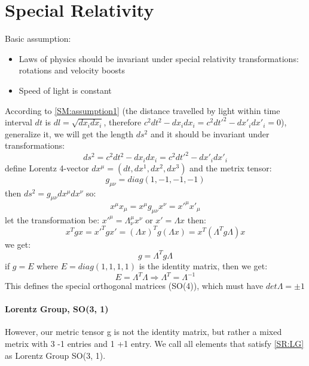 \chapter{Special Relativity}
Basic assumption:
\begin{itemize}
    \item Laws of physics should be invariant under special relativity 
	transformations: rotations and velocity boosts	\eqnum\label{SM:assumption1}
    \item Speed of light is constant	\eqnum\label{SM:assumption2}
\end{itemize}

According to \ref{SM:assumption1} 
(the distance travelled by light within time
interval $dt$ is $dl = \sqrt{dx_idx_i}$, therefore $c^2dt^2 - dx_idx_i = c^2dt'^2 - dx'_idx'_i = 0$), 
generalize it, we will get the length $ds^2$ and it should be invariant under
transformations:
\begin{equation}
    ds^2 = c^2dt^2 - dx_idx_i = c^2dt'^2 - dx'_i dx'_i
\end{equation}
define Lorentz 4-vector $dx^\mu = (dt, dx^1, dx^2, dx^3)$ and the metrix tensor:
$$ g_{\mu\nu} = diag(1,-1, -1, -1) $$
then $ds^2 = g_{\mu\nu} dx^\mu dx^\nu$
so:
\begin{equation}
    x^\mu x_\mu = x^\mu g_{\mu\nu}x^\nu = x'^\mu x'_\mu
\end{equation}
let the transformation be: $x'^\mu = \Lambda^\mu_\nu x^\nu$ or $x' = \Lambda x$
then:
\begin{equation}
    x^T g x = x'^T g x' = (\Lambda x)^T g (\Lambda x) = x^T (\Lambda^T g \Lambda) x
\end{equation}
we get:
\begin{equation}
    \label{SR:LG}
 g = \Lambda^T g \Lambda
\end{equation}
if $g = E$ where $E = diag(1, 1, 1,1 )$ is the identity matrix, then we get:
$$ E = \Lambda^T \Lambda \Rightarrow \Lambda^T = \Lambda^{-1}$$
This defines the special orthogonal matrices (SO(4)), which must have $det\Lambda = \pm 1$

\subsubsection{Lorentz Group, SO(3, 1)}
However, our metric tensor g is not the identity matrix, but rather a mixed 
metrix with 3 -1 entries and 1 +1 entry. We call all elements that satisfy
\ref{SR:LG} as Lorentz Group SO(3, 1).

